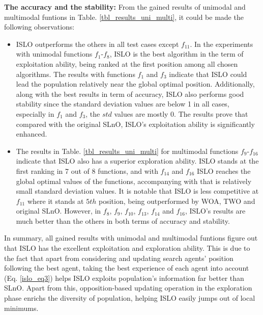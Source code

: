 \documentclass[../main.tex]{subfiles}
\begin{document}
	\textbf{The accuracy and the stability:} From the gained results of unimodal and multimodal funtions in Table. \ref{tbl_results_uni_multi}, it could be made the following observations:
\begin{itemize}
\item ISLO outperforms the others in all test cases except $f_{11}$. In the experiments with unimodal functions $f_1$-$f_8$, ISLO is the best algorithm in the term of exploitation ability, being ranked at the first position among all chosen algorithms. The results with functions $f_1$ and $f_3$ indicate that ISLO could lead the population relatively near the global optimal position. Additionally, along with the best results in term of accuracy, ISLO also performs good stability since the standard deviation values are below 1 in all cases, especially in $f_1$ and $f_3$, the $std$ values are mostly 0. The results prove that compared with the original SLnO, ISLO's exploitation ability is significantly enhanced. 
\item The results in Table. \ref{tbl_results_uni_multi} for multimodal functions $f_9$-$f_{16}$ indicate that ISLO also has a superior exploration ability. ISLO stands at the first ranking in 7 out of 8 functions, and with $f_{14}$ and $f_{16}$ ISLO reaches the global optimal values of the functions, accompanying with that is relatively small standard deviation values. It is notable that ISLO is less competitive at $f_{11}$ where it stands at $5th$ position, being outperformed by WOA, TWO and original SLnO. However, in $f_8$, $f_9$, $f_{10}$, $f_{13}$, $f_{14}$ and $f_{16}$, ISLO's results are much better than the others in both terms of accuracy and stability.
\end{itemize}
In summary, all gained results with unimodal and multimodal funtions figure out that ISLO has the excellent exploitation and exploration ability. This is due to the fact that apart from considering and updating search agents' position following the best agent, taking the best experience of each agent into account (Eq. \ref{islo_eq3}) helps ISLO exploits population's information far better than SLnO. Apart from this, opposition-based updating operation in the exploration phase enrichs the diversity of population, helping ISLO easily jumps out of local minimums.
\end{document}
